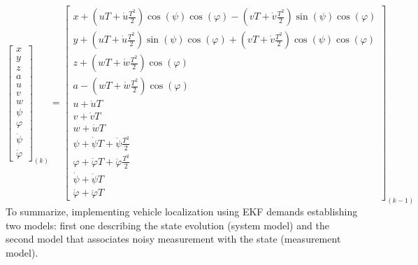 \begin{equation}
\begin{bmatrix} x \\ y \\ z \\ a \\ u \\ v \\ w \\ \psi \\ \varphi \\ \dot{\psi} \\ \dot{\varphi} \end{bmatrix}_{(k)} =
\begin{bmatrix} x + (uT+\dot{u}\frac{T^{2}}{2})\cos(\psi)\cos(\varphi) - (vT+\dot{v}\frac{T^{2}}{2})\sin(\psi)\cos(\varphi) \\ 
                y + (uT+\dot{u}\frac{T^{2}}{2})\sin(\psi)\cos(\varphi) + (vT+\dot{v}\frac{T^{2}}{2})\cos(\psi)\cos(\varphi) \\ 
                z + (wT+\dot{w}\frac{T^{2}}{2})\cos(\varphi) \\ 
                a - (wT+\dot{w}\frac{T^{2}}{2})\cos(\varphi) \\ 
                u + \dot{u}T \\ 
                v + \dot{v}T \\ 
                w + \dot{w}T \\ 
                \psi    + \dot{\psi}T    + \ddot{\psi}   \frac{T^{2}}{2} \\ 
                \varphi + \dot{\varphi}T + \ddot{\varphi}\frac{T^{2}}{2} \\ 
                \dot{\psi}    + \ddot{\psi}T \\ 
                \dot{\varphi} + \ddot{\varphi}T
\end{bmatrix}_{(k-1)} 
\label{eq:state-tran-matrix}
\end{equation}
To summarize, implementing vehicle localization using EKF demands establishing two models: first one describing the state evolution (system model) and the second model that associates noisy measurement with the state (measurement model). 
